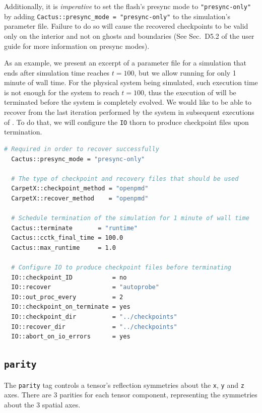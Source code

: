 Additionally, it is \textit{imperative} to set the flash's presync mode to \texttt{"presync-only"} by adding \texttt{Cactus::presync\_mode = "presync-only"} to the simulation's parameter file. Failure to do so will cause the recovered checkpoints to be valid only on the interior and not on ghosts and boundaries (See Sec.~D5.2 of the \Cactus\space user guide for more information on presync modes).

As an example, we present an excerpt of a parameter file for a simulation that ends after simulation time reaches $t=100$, but we allow \Cactus\space running for only 1 minute of wall time. For the physical system being simulated, such execution time is not enough for the system to reach $t=100$, thus the execution of \Cactus\space will be terminated before the system is completely evolved. We would like to be able to recover from the last iteration performed by the system in subsequent executions of \Cactus. To do that, we will configure the \texttt{IO} thorn to produce checkpoint files upon \Cactus\space termination.

\begin{lstlisting}[language=bash]
  # Required in order to recover successfully
  Cactus::presync_mode = "presync-only"

  # The type of checkpoint and recovery files that should be used
  CarpetX::checkpoint_method = "openpmd"
  CarpetX::recover_method    = "openpmd"

  # Schedule termination of the simulation for 1 minute of wall time
  Cactus::terminate       = "runtime"
  Cactus::cctk_final_time = 100.0
  Cactus::max_runtime     = 1.0

  # Configure IO to produce checkpoint files before terminating
  IO::checkpoint_ID           = no
  IO::recover                 = "autoprobe"
  IO::out_proc_every          = 2
  IO::checkpoint_on_terminate = yes
  IO::checkpoint_dir          = "../checkpoints"
  IO::recover_dir             = "../checkpoints"
  IO::abort_on_io_errors      = yes
\end{lstlisting}

\subsection{\texttt{parity}}
The \texttt{parity} tag controls a tensor's reflection symmetries about the \texttt{x}, \texttt{y} and \texttt{z} axes. There are 3 parities for each tensor component, representing the symmetries about the 3 spatial axes.

